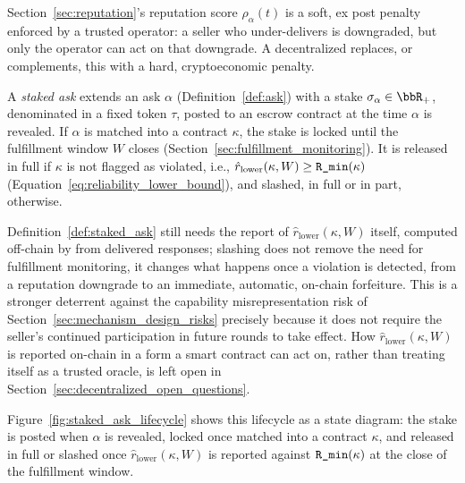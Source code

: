 Section~\ref{sec:reputation}'s reputation score $\rho_\alpha(t)$ is a soft,
ex post penalty enforced by a trusted operator: a seller who under-delivers
is downgraded, but only the operator can act on that downgrade. A
decentralized \NoesisMarket{} replaces, or complements, this with a hard,
cryptoeconomic penalty.

\begin{definition}
\label{def:staked_ask}
A \emph{staked ask} extends an ask $\alpha$ (Definition~\ref{def:ask})
with a stake $\sigma_\alpha \in \bbR_+$, denominated in a fixed token
$\tau$, posted to an escrow contract at the time $\alpha$ is revealed. If
$\alpha$ is matched into a contract $\kappa$, the stake is locked until
the fulfillment window $W$ closes (Section~\ref{sec:fulfillment_monitoring}).
It is released in full if $\kappa$ is not flagged as violated, i.e.,
$\hat r_{\text{lower}}(\kappa, W) \geq \textnormal{\texttt{R\_min}}(\kappa)$
(Equation~\eqref{eq:reliability_lower_bound}), and slashed, in full or in
part, otherwise.
\end{definition}

Definition~\ref{def:staked_ask} still needs the report of
$\hat r_{\text{lower}}(\kappa, W)$ itself, computed off-chain by
\NoesisServer{} from delivered responses; slashing does not remove the
need for fulfillment monitoring, it changes what happens once a violation
is detected, from a reputation downgrade to an immediate, automatic,
on-chain forfeiture. This is a stronger deterrent against the capability
misrepresentation risk of Section~\ref{sec:mechanism_design_risks}
precisely because it does not require the seller's continued
participation in future rounds to take effect. How $\hat
r_{\text{lower}}(\kappa, W)$ is reported on-chain in a form a smart
contract can act on, rather than treating \NoesisServer{} itself as a
trusted oracle, is left open in Section~\ref{sec:decentralized_open_questions}.

Figure~\ref{fig:staked_ask_lifecycle} shows this lifecycle as a state
diagram: the stake is posted when $\alpha$ is revealed, locked once
matched into a contract $\kappa$, and released in full or slashed once
$\hat r_{\text{lower}}(\kappa, W)$ is reported against $\textnormal{\texttt{R\_min}}(\kappa)$
at the close of the fulfillment window.


